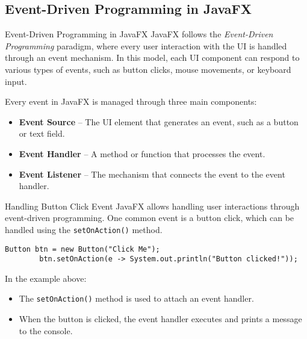 \documentclass[aspectratio=169, table]{beamer}
\begin{document}
\subsection{Event-Driven Programming in JavaFX}

\begin{frame}[fragile]{Event-Driven Programming in JavaFX}
	\vspace{20pt}
	JavaFX follows the \textit{Event-Driven Programming} paradigm,  
	where every user interaction with the UI is handled through an event mechanism.  
	In this model, each UI component can respond to various types of events,  
	such as button clicks, mouse movements, or keyboard input.
	
	\bigskip
	Every event in JavaFX is managed through three main components:
	\begin{itemize}
		\item \textbf{Event Source} – The UI element that generates an event, such as a button or text field.
		\item \textbf{Event Handler} – A method or function that processes the event.
		\item \textbf{Event Listener} – The mechanism that connects the event to the event handler.
	\end{itemize}
\end{frame}


\begin{frame}[fragile]{Handling Button Click Event}
	\vspace{20pt}
	JavaFX allows handling user interactions through event-driven programming.  
	One common event is a button click, which can be handled using the \texttt{setOnAction()} method.
	
	\bigskip
	\begin{lstlisting}[style=JavaStyle]
		Button btn = new Button("Click Me");
		btn.setOnAction(e -> System.out.println("Button clicked!"));
	\end{lstlisting}
	
	\bigskip
	In the example above:
	\begin{itemize}
		\item The \texttt{setOnAction()} method is used to attach an event handler.
		\item When the button is clicked, the event handler executes and prints a message to the console.
	\end{itemize}
\end{frame}
\end{document}
